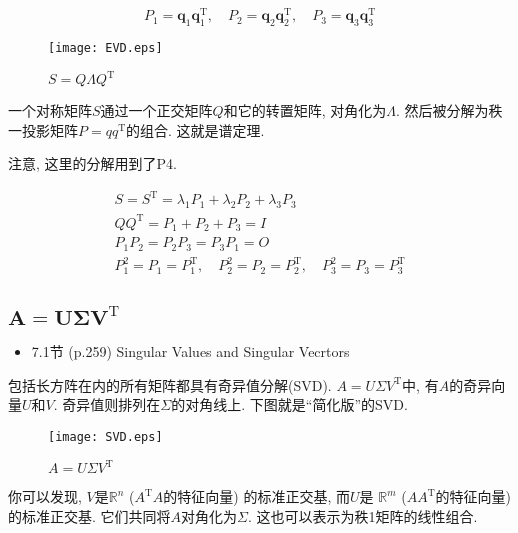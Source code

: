 \documentclass[letterpaper]{article}
\DeclareRobustCommand\transp{^{\mathrm{T}}}
\begin{document}
\begin{equation*}
  P_1=\bm{q}_1 \bm{q}_1\transp, \quad P_2=\bm{q}_2 \bm{q}_2\transp, \quad P_3=\bm{q}_3 \bm{q}_3\transp
\end{equation*}


\begin{figure}[H]
  \centering
  \texttt{[image: EVD.eps]}
  \caption{$S=Q \Lambda Q\transp$}
\end{figure}

一个对称矩阵$S$通过一个正交矩阵$Q$和它的转置矩阵, 对角化为$\Lambda$. 
然后被分解为秩一投影矩阵$P=qq\transp$的组合. 这就是谱定理. 

注意, 这里的分解用到了P4.

\begin{gather*}
  S=S\transp = \lambda_1 P_1 + \lambda_2 P_2 + \lambda_3 P_3\\
  QQ\transp = P_1 + P_2 + P_3 = I \\
  P_1 P_2 = P_2 P_3 = P_3 P_1 = O\\
  P_1^2 =P_1=P_1\transp, \quad P_2^2=P_2=P_2\transp, \quad P_3^2=P_3=P_3\transp
\end{gather*}

\subsection{$\boldsymbol{A=U \Sigma V\transp}$}


\begin{itemize}
  \item 7.1节 (p.259) Singular Values and Singular Vecrtors
\end{itemize}

包括长方阵在内的所有矩阵都具有奇异值分解(SVD). 
$A=U \Sigma V\transp$中, 有$A$的奇异向量$U$和$V$. 
奇异值则排列在$\Sigma$的对角线上. 
下图就是“简化版”的SVD. 


\begin{figure}[H]
  \centering
  \texttt{[image: SVD.eps]}
  \caption{$A=U \Sigma V\transp$}
\end{figure}

你可以发现, $V$是$\mathbb{R}^n$ ($A\transp A$的特征向量) 的标准正交基, 
而$U$是 $\mathbb{R}^m$ ($AA\transp$的特征向量) 的标准正交基. 
它们共同将$A$对角化为$\Sigma$. 
这也可以表示为秩1矩阵的线性组合. 
\end{document}
